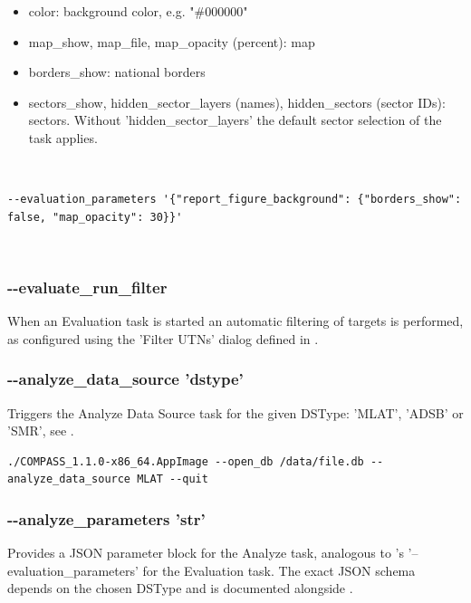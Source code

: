 \begin{itemize}
\item color: background color, e.g. "\#000000"
\item map\_show, map\_file, map\_opacity (percent): map
\item borders\_show: national borders
\item sectors\_show, hidden\_sector\_layers (names), hidden\_sectors (sector IDs): sectors. Without 'hidden\_sector\_layers' the default sector selection of the task applies.
\end{itemize}
\ \\

\begin{lstlisting}[basicstyle=\small\ttfamily]
--evaluation_parameters '{"report_figure_background": {"borders_show": false, "map_opacity": 30}}'
\end{lstlisting}
\ \\

\subsubsection{-{}-evaluate\_run\_filter}

When an Evaluation task is started an automatic filtering of targets is performed, as configured using the 'Filter UTNs' dialog defined in .

\subsubsection{-{}-analyze\_data\_source 'dstype'}

Triggers the Analyze Data Source task for the given DSType: 'MLAT', 'ADSB' or 'SMR', see .

\begin{lstlisting}
./COMPASS_1.1.0-x86_64.AppImage --open_db /data/file.db --analyze_data_source MLAT --quit
\end{lstlisting}

\subsubsection{-{}-analyze\_parameters 'str'}

Provides a JSON parameter block for the Analyze task, analogous to 's '--evaluation\_parameters' for the Evaluation task. The exact JSON schema depends on the chosen DSType and is documented alongside . \\

